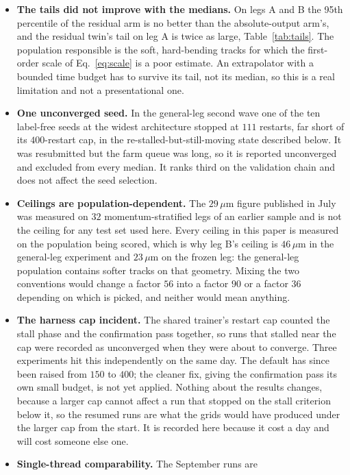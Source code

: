 \documentclass[11pt,a4paper]{article}
\newcommand{\um}{\ensuremath{\,\mu\mathrm{m}}}
\begin{document}
\begin{itemize}
  \item \textbf{The tails did not improve with the medians.} On legs A and B the
  95th percentile of the residual arm is no better than the absolute-output
  arm's, and the residual twin's tail on leg A is twice as large,
  Table~\ref{tab:tails}. The population responsible is the soft, hard-bending
  tracks for which the first-order scale of Eq.~\eqref{eq:scale} is a poor
  estimate. An extrapolator with a bounded time budget has to survive its tail,
  not its median, so this is a real limitation and not a presentational one.
  \item \textbf{One unconverged seed.} In the general-leg second wave one of the ten
  label-free seeds at the widest architecture stopped at $111$ restarts, far
  short of its $400$-restart cap, in the re-stalled-but-still-moving state
  described below. It was resubmitted but the farm queue was long, so it is reported
  unconverged and excluded from every median. It ranks third on the validation
  chain and does not affect the seed selection.
  \item \textbf{Ceilings are population-dependent.} The $29\um$ figure published
  in July was measured on $32$ momentum-stratified legs of an earlier sample and
  is not the ceiling for any test set used here. Every ceiling in this paper is
  measured on the population being scored, which is why leg B's ceiling is
  $46\um$ in the general-leg experiment and $23\um$ on the frozen leg: the
  general-leg population contains softer tracks on that geometry. Mixing the two
  conventions would change a factor $56$ into a factor $90$ or a factor $36$
  depending on which is picked, and neither would mean anything.
  \item \textbf{The harness cap incident.} The shared trainer's restart cap
  counted the stall phase and the confirmation pass together, so runs that
  stalled near the cap were recorded as unconverged when they were about to
  converge. Three experiments hit this independently on the same day. The
  default has since been raised from $150$ to $400$; the cleaner fix, giving the
  confirmation pass its own small budget, is not yet applied. Nothing about the
  results changes, because a larger cap cannot affect a run that stopped on the
  stall criterion below it, so the resumed runs are what the grids would have
  produced under the larger cap from the start. It is recorded here because it
  cost a day and will cost someone else one.
  \item \textbf{Single-thread comparability.} The September runs are

\end{itemize}
\end{document}
